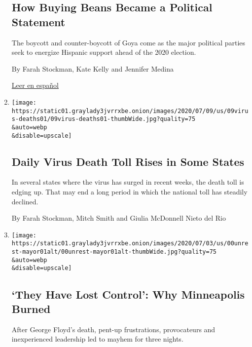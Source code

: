 \begin{enumerate}
  \hypertarget{how-buying-beans-became-a-political-statement}{%
  \subsection{How Buying Beans Became a Political
  Statement}\label{how-buying-beans-became-a-political-statement}}

  The boycott and counter-boycott of Goya come as the major political
  parties seek to energize Hispanic support ahead of the 2020 election.

  By Farah Stockman, Kate Kelly and Jennifer Medina

  \href{https://www.nytimes3xbfgragh.onion/es/2020/07/19/espanol/goya-boicot-trump.html}{Leer
  en español}
\item
  \href{/2020/07/10/us/daily-virus-death-toll-rises-in-some-states.html}{}

  \texttt{[image: https://static01.graylady3jvrrxbe.onion/images/2020/07/09/us/09virus-deaths01/09virus-deaths01-thumbWide.jpg?quality=75\\\&auto=webp\\\&disable=upscale]}

  \hypertarget{daily-virus-death-toll-rises-in-some-states}{%
  \subsection{Daily Virus Death Toll Rises in Some
  States}\label{daily-virus-death-toll-rises-in-some-states}}

  In several states where the virus has surged in recent weeks, the
  death toll is edging up. That may end a long period in which the
  national toll has steadily declined.

  By Farah Stockman, Mitch Smith and Giulia McDonnell Nieto del Rio
\item
  \href{/2020/07/03/us/minneapolis-government-george-floyd.html}{}

  \texttt{[image: https://static01.graylady3jvrrxbe.onion/images/2020/07/03/us/00unrest-mayor01alt/00unrest-mayor01alt-thumbWide.jpg?quality=75\\\&auto=webp\\\&disable=upscale]}

  \hypertarget{they-have-lost-control-why-minneapolis-burned}{%
  \subsection{`They Have Lost Control': Why Minneapolis
  Burned}\label{they-have-lost-control-why-minneapolis-burned}}

  After George Floyd's death, pent-up frustrations, provocateurs and
  inexperienced leadership led to mayhem for three nights.


\end{enumerate}
